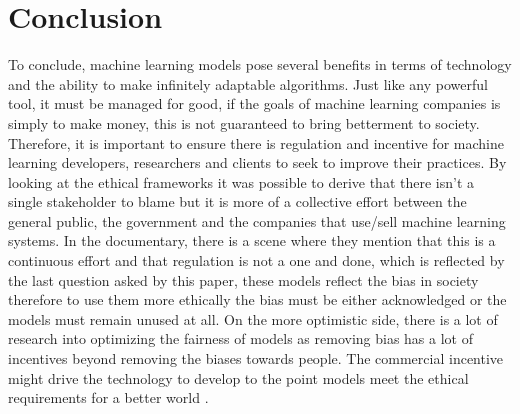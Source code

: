 \section{Conclusion}
To conclude, machine learning models pose several benefits in terms of technology and the ability to make infinitely adaptable algorithms. Just like any powerful tool, it must be managed for good, if the goals of machine learning companies is simply to make money, this is not guaranteed to bring betterment to society. Therefore, it is important to ensure there is regulation and incentive for machine learning developers, researchers and clients to seek to improve their practices. By looking at the ethical frameworks it was possible to derive that there isn't a single stakeholder to blame but it is more of a collective effort between the general public, the government and the companies that use/sell machine learning systems. In the documentary, there is a scene where they mention that this is a continuous effort and that regulation is not a one and done, which is reflected by the last question asked by this paper, these models reflect the bias in society therefore to use them more ethically the bias must be either acknowledged or the models must remain unused at all. On the more optimistic side, there is a lot of research into optimizing the fairness of models as removing bias has a lot of incentives beyond removing the biases towards people. The commercial incentive might drive the technology to develop to the point models meet the ethical requirements for a better world \cite{BiasReduction}.
